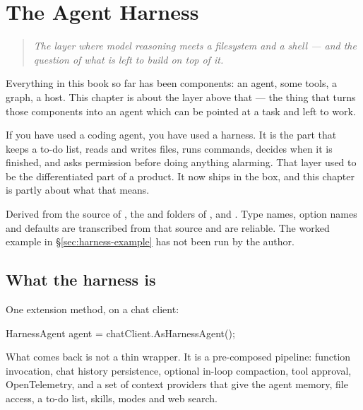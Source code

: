 \chapter{The Agent Harness}
\label{ch:harness}

\begin{quote}\itshape
The layer where model reasoning meets a filesystem and a shell --- and the
question of what is left to build on top of it.
\end{quote}

\noindent
Everything in this book so far has been components: an agent, some tools, a
graph, a host. This chapter is about the layer above that --- the thing that turns
those components into an agent which can be pointed at a task and left to work.

If you have used a coding agent, you have used a harness. It is the part that
keeps a to-do list, reads and writes files, runs commands, decides when it is
finished, and asks permission before doing anything alarming. That layer used to
be the differentiated part of a product. It now ships in the box, and this
chapter is partly about what that means.

\begin{verifybox}
Derived from the source of , the
 and  folders of , and
. Type names, option names and defaults are
transcribed from that source and are reliable. The worked example in
\S\ref{sec:harness-example} has not been run by the author.
\end{verifybox}

\section{What the harness is}
\label{sec:harness-what}

One extension method, on a chat client:

\begin{csharp}[caption={A harness agent}, label={lst:harness-basic}]
HarnessAgent agent = chatClient.AsHarnessAgent();
\end{csharp}

What comes back is not a thin wrapper. It is a pre-composed pipeline: function
invocation, chat history persistence, optional in-loop compaction, tool approval,
OpenTelemetry, and a set of context providers that give the agent memory, file
access, a to-do list, skills, modes and web search.

